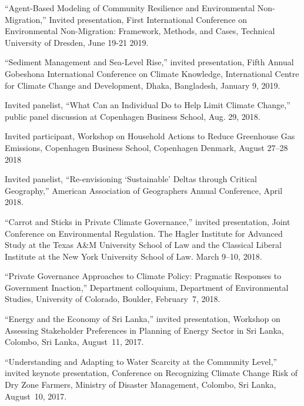 \item ``Agent-Based Modeling of Community Resilience and Environmental
 Non-Migration,'' Invited presentation, First International Conference on
 Environmental Non-Migration: Framework, Methods, and Cases, Technical
 University of Dresden, June 19-21 2019.
\item ``Sediment Management and Sea-Level Rise,'' invited presentation, Fifth
  Annual Gobeshona International Conference on Climate Knowledge, International
  Centre for Climate Change and Development, Dhaka, Bangladesh, January 9, 2019.
\item Invited panelist, ``What Can an Individual Do to Help Limit Climate
  Change,'' public panel discussion at Copenhagen Business School, Aug. 29,
  2018.
\item Invited participant, Workshop on Household Actions to Reduce Greenhouse
  Gas Emissions, Copenhagen Business School, Copenhagen Denmark, August 27--28
  2018
\item Invited panelist, ``Re-envisioning `Sustainable' Deltas through Critical
  Geography,'' American Association of Geographers Annual Conference, April
  2018.
\item ``Carrot and Sticks in Private Climate Governance,'' invited
  presentation, Joint Conference on Environmental Regulation. The Hagler
  Institute for Advanced Study at the Texas A\&M University School of Law and
  the Classical Liberal Institute at the New York University School of Law.
  March 9--10, 2018.
\item ``Private Governance Approaches to Climate Policy: Pragmatic Responses to
  Government Inaction,'' Department colloquium, Department of Environmental
  Studies, University of Colorado, Boulder, February~7, 2018.
\item ``Energy and the Economy of Sri Lanka,'' invited presentation, Workshop
  on Assessing Stakeholder Preferences in Planning of Energy Sector in Sri
  Lanka, Colombo, Sri Lanka, August~11, 2017.
\item ``Understanding and Adapting to Water Scarcity at the Community Level,''
  invited keynote presentation, Conference on Recognizing Climate Change Risk
  of Dry Zone Farmers, Ministry of Disaster Management, Colombo, Sri Lanka,
  August~10, 2017.
